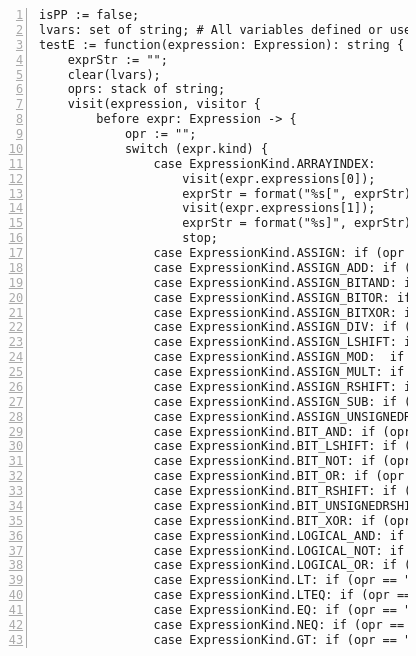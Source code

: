 \begin{figure}[ht!]
\begin{lstlisting}[numbers=left, tabsize=4, escapechar=@, caption={API Usage Mining Analysis},label={lst:aun-code}, lastline = 10]
isPP := false;
lvars: set of string; # All variables defined or used in a node
testE := function(expression: Expression): string {
    exprStr := "";
    clear(lvars);
    oprs: stack of string;
    visit(expression, visitor {
        before expr: Expression -> {
            opr := "";
            switch (expr.kind) {
                case ExpressionKind.ARRAYINDEX:
                    visit(expr.expressions[0]);
                    exprStr = format("%s[", exprStr);
                    visit(expr.expressions[1]);
                    exprStr = format("%s]", exprStr);
                    stop;
                case ExpressionKind.ASSIGN: if (opr == "") opr = "="; 
                case ExpressionKind.ASSIGN_ADD: if (opr == "") opr = "+="; 
                case ExpressionKind.ASSIGN_BITAND: if (opr == "") opr = "&="; 
                case ExpressionKind.ASSIGN_BITOR: if (opr == "") opr = "|="; 
                case ExpressionKind.ASSIGN_BITXOR: if (opr == "") opr = "^="; 
                case ExpressionKind.ASSIGN_DIV: if (opr == "") opr = "/="; 
                case ExpressionKind.ASSIGN_LSHIFT: if (opr == "") opr = "<<="; 
                case ExpressionKind.ASSIGN_MOD:  if (opr == "") opr = "%="; 
                case ExpressionKind.ASSIGN_MULT: if (opr == "") opr = "*="; 
                case ExpressionKind.ASSIGN_RSHIFT: if (opr == "") opr = ">>="; 
                case ExpressionKind.ASSIGN_SUB: if (opr == "") opr = "-="; 
                case ExpressionKind.ASSIGN_UNSIGNEDRSHIFT: if (opr == "") opr = ">>>="; 
                case ExpressionKind.BIT_AND: if (opr == "") opr = "&"; 
                case ExpressionKind.BIT_LSHIFT: if (opr == "") opr = "<<"; 
                case ExpressionKind.BIT_NOT: if (opr == "") opr = "~"; 
                case ExpressionKind.BIT_OR: if (opr == "") opr = "|"; 
                case ExpressionKind.BIT_RSHIFT: if (opr == "") opr = ">>"; 
                case ExpressionKind.BIT_UNSIGNEDRSHIFT: if (opr == "") opr = ">>>"; 
                case ExpressionKind.BIT_XOR: if (opr == "") opr = "^"; 
                case ExpressionKind.LOGICAL_AND: if (opr == "") opr = "&&"; 
                case ExpressionKind.LOGICAL_NOT: if (opr == "") opr = "!";
                case ExpressionKind.LOGICAL_OR: if (opr == "") opr = "||";
                case ExpressionKind.LT: if (opr == "") opr = "<";
                case ExpressionKind.LTEQ: if (opr == "") opr = "<="; 
                case ExpressionKind.EQ: if (opr == "") opr = "==";
                case ExpressionKind.NEQ: if (opr == "") opr = "!=";
                case ExpressionKind.GT: if (opr == "") opr = ">";

\end{lstlisting}
\end{figure}
